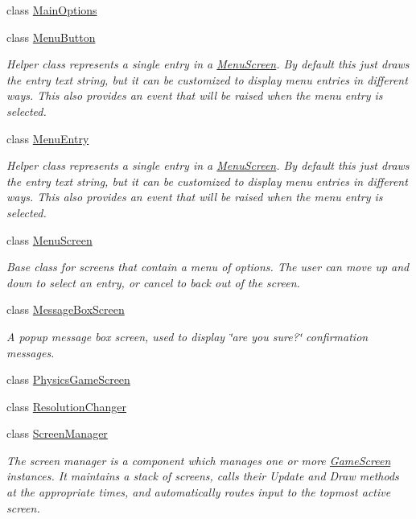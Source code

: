 \begin{DoxyCompactItemize}
\item 
class \hyperlink{classgearit_1_1xna_1_1_main_options}{Main\+Options}
\item 
class \hyperlink{classgearit_1_1xna_1_1_menu_button}{Menu\+Button}
\begin{DoxyCompactList}\small\item\em Helper class represents a single entry in a \hyperlink{classgearit_1_1xna_1_1_menu_screen}{Menu\+Screen}. By default this just draws the entry text string, but it can be customized to display menu entries in different ways. This also provides an event that will be raised when the menu entry is selected. \end{DoxyCompactList}\item 
class \hyperlink{classgearit_1_1xna_1_1_menu_entry}{Menu\+Entry}
\begin{DoxyCompactList}\small\item\em Helper class represents a single entry in a \hyperlink{classgearit_1_1xna_1_1_menu_screen}{Menu\+Screen}. By default this just draws the entry text string, but it can be customized to display menu entries in different ways. This also provides an event that will be raised when the menu entry is selected. \end{DoxyCompactList}\item 
class \hyperlink{classgearit_1_1xna_1_1_menu_screen}{Menu\+Screen}
\begin{DoxyCompactList}\small\item\em Base class for screens that contain a menu of options. The user can move up and down to select an entry, or cancel to back out of the screen. \end{DoxyCompactList}\item 
class \hyperlink{classgearit_1_1xna_1_1_message_box_screen}{Message\+Box\+Screen}
\begin{DoxyCompactList}\small\item\em A popup message box screen, used to display \char`\"{}are you sure?\char`\"{} confirmation messages. \end{DoxyCompactList}\item 
class \hyperlink{classgearit_1_1xna_1_1_physics_game_screen}{Physics\+Game\+Screen}
\item 
class \hyperlink{classgearit_1_1xna_1_1_resolution_changer}{Resolution\+Changer}
\item 
class \hyperlink{classgearit_1_1xna_1_1_screen_manager}{Screen\+Manager}
\begin{DoxyCompactList}\small\item\em The screen manager is a component which manages one or more \hyperlink{classgearit_1_1xna_1_1_game_screen}{Game\+Screen} instances. It maintains a stack of screens, calls their Update and Draw methods at the appropriate times, and automatically routes input to the topmost active screen. \end{DoxyCompactList}\item 

\end{DoxyCompactItemize}
